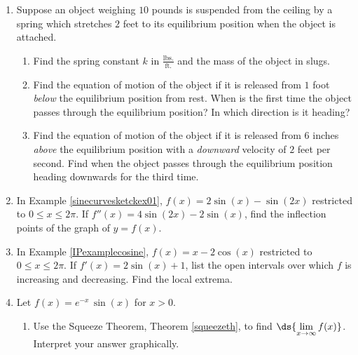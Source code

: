 \documentclass{ximera}
\begin{document}
\pagebreak

\begin{enumerate}

\setcounter{enumi}{\value{HW}}
\item  Suppose an object weighing $10$ pounds is suspended from the ceiling by a spring which stretches $2$ feet to its equilibrium position when the object is attached.  

\begin{enumerate}

\item  Find the spring constant $k$ in $\frac{\text{lbs.}}{\text{ft.}}$ and the mass of the object in slugs.
\item  Find the equation of motion of the object if it is released from $1$ foot \textit{below} the equilibrium position from rest.  When is the first time the object passes through the equilibrium position? In which direction is it heading?
\item  Find the equation of motion of the object if it is released from $6$ inches \textit{above} the equilibrium position with a \textit{downward} velocity of $2$ feet per second.  Find when the object passes through the equilibrium position heading downwards for the third time.


\end{enumerate}

\setcounter{HW}{\value{enumi}}

\item\label{sinecurvesketckex01IPs} In Example \ref{sinecurvesketckex01},  $f(x) = 2\sin(x) - \sin(2x)$  restricted to $0 \leq x \leq 2\pi$.  If $f''(x) = 4 \sin(2x) - 2\sin(x)$,  find the inflection points of the graph of $y = f(x)$. 

\item\label{IPexamplecosineincdec} In Example \ref{IPexamplecosine},  $f(x) =x-2\cos(x)$ restricted to $0 \leq x \leq 2\pi$.  If $f'(x) = 2\sin(x)+1$, list the open intervals over which $f$ is increasing and decreasing.  Find the local extrema. 

\item  Let $f(x) = e^{-x} \, \sin(x)$ for $x > 0$.

\begin{enumerate}

\item  Use the Squeeze Theorem, Theorem \ref{squeezeth},  to find $\ds{\lim_{x \rightarrow \infty} f(x)}$.  Interpret your answer graphically.

\smallskip


\end{enumerate}
\end{enumerate}
\end{document}
